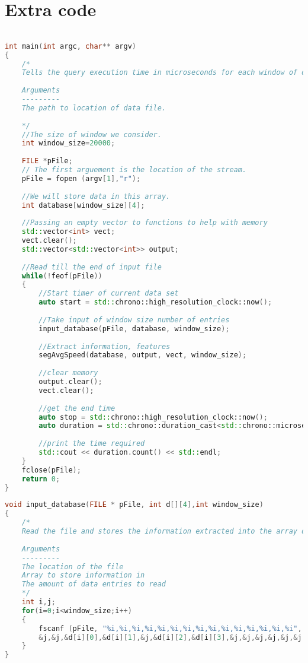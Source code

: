 \chapter{Extra code}
\label{appendix}
\thispagestyle{myheadings}

\begin{lstlisting}[language=C++, caption= code overview for simple query, label={lst:simple_query_overview}]

int main(int argc, char** argv)
{
    /*
    Tells the query execution time in microseconds for each window of data.
    
    Arguments
    ---------
    The path to location of data file.
    
    */
    //The size of window we consider.
    int window_size=20000;
    
    FILE *pFile;
    // The first arguement is the location of the stream.
    pFile = fopen (argv[1],"r");
    
    //We will store data in this array.
    int database[window_size][4];
    
    //Passing an empty vector to functions to help with memory
    std::vector<int> vect;
    vect.clear();
    std::vector<std::vector<int>> output;
    
    //Read till the end of input file
    while(!feof(pFile))
    {
        //Start timer of current data set
        auto start = std::chrono::high_resolution_clock::now();
        
        //Take input of window size number of entries
        input_database(pFile, database, window_size);
        
        //Extract information, features
        segAvgSpeed(database, output, vect, window_size);
        
        //clear memory
        output.clear();
        vect.clear();
        
        //get the end time 
        auto stop = std::chrono::high_resolution_clock::now(); 
        auto duration = std::chrono::duration_cast<std::chrono::microseconds>(stop - start);
        
        //print the time required
        std::cout << duration.count() << std::endl;
    }
    fclose(pFile);
    return 0;
}
\end{lstlisting}

\begin{lstlisting}[language=C++, caption= File reading function for simple query, label={lst:simple_query_input}]
void input_database(FILE * pFile, int d[][4],int window_size)
{
    /*
    Read the file and stores the information extracted into the array d.
    
    Arguments
    ---------
    The location of the file
    Array to store information in
    The amount of data entries to read
    */
    int i,j;
    for(i=0;i<window_size;i++)
    {
        fscanf (pFile, "%i,%i,%i,%i,%i,%i,%i,%i,%i,%i,%i,%i,%i,%i,%i", &j,
        &j,&j,&d[i][0],&d[i][1],&j,&d[i][2],&d[i][3],&j,&j,&j,&j,&j,&j,&j);
    }
}
\end{lstlisting}

